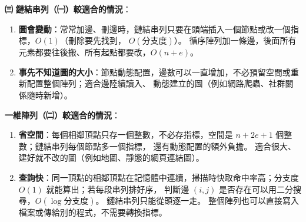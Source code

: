 \begin{pastsoln}
\textbf{㈢} \textbf{鏈結串列（㈠）較適合的情況}：
\begin{enumerate}
\item \textbf{圖會變動}：常常加邊、刪邊時，鏈結串列只要在頭端插入一個節點或改一個指標，$O(1)$（刪除要先找到，
$O(\text{分支度})$）。 循序陣列加一條邊，後面所有元素都要往後搬、所有起點都要改，$O(n + e)$。
\item \textbf{事先不知道圖的大小}：節點動態配置，邊數可以一直增加，不必預留空間或重新配置整個陣列；適合邊陸續讀入、
動態建立的圖（例如網路爬蟲、社群關係隨時新增）。
\end{enumerate}
\textbf{一維陣列（㈡）較適合的情況}：
\begin{enumerate}
\item \textbf{省空間}：每個相鄰頂點只存一個整數，不必存指標，空間是 $n + 2e + 1$ 個整數；鏈結串列每個節點多一個指標，
還有動態配置的額外負擔。 適合很大、建好就不改的圖（例如地圖、靜態的網頁連結圖）。
\item \textbf{查詢快}：同一頂點的相鄰頂點在記憶體中連續，掃描時快取命中率高；分支度 $O(1)$ 就能算出；若每段串列排好序，
判斷邊 $(i, j)$ 是否存在可以用二分搜尋，$O(\log \text{分支度})$。 鏈結串列只能從頭逐一走。 整個陣列也可以直接寫入
檔案或傳給別的程式，不需要轉換指標。
\end{enumerate}
\end{pastsoln}
